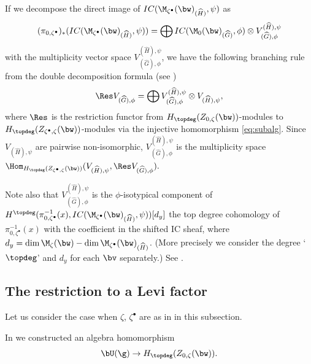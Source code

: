 If we decompose the direct image of
$IC(\M_{\zeta^\bullet}(\bw)_{(\widehat H)},\psi)$ as
\begin{equation}\label{eq:bullet}
   (\pi_{0,\zeta^\bullet})_*(IC(\M_{\zeta^\bullet}(\bw)_{(\widehat
     H)},\psi))
   = \bigoplus IC(\M_0(\bw)_{(\widehat G)},\phi)\otimes
     V_{(\widehat G),\phi}^{(\widehat H),\psi}
\end{equation}
with the multiplicity vector space $V_{(\widehat G),\phi}^{(\widehat
  H),\psi}$, we have the following branching rule from the double
decomposition formula (see \cite[1.11]{BM})
\begin{equation}\label{eq:branching}
   \Res V_{(\widehat G),\phi} = \bigoplus
   V_{(\widehat G),\phi}^{(\widehat H),\psi} \otimes V_{(\widehat H),\psi},
\end{equation}
where $\Res$ is the restriction functor from
$H_{\topdeg}(Z_{0,\zeta}(\bw))$-modules to
$H_{\topdeg}(Z_{\zeta^\bullet,\zeta}(\bw))$-modules via the injective
homomorphism \eqref{eq:subalg}. Since $V_{(\widehat H),\psi}$ are
pairwise non-isomorphic, $V_{(\widehat G),\phi}^{(\widehat H),\psi}$
is the multiplicity space
\(
   \Hom_{H_{\topdeg}(Z_{\zeta^\bullet,\zeta}(\bw))}
   (V_{(\widehat H),\psi}, \Res V_{(\widehat G),\phi}).
\)


Note also that $V_{(\widehat G),\phi}^{(\widehat H),\psi}$ is the
$\phi$-isotypical component of
\(
   H^{\topdeg}(\pi_{0,\zeta^\bullet}^{-1}(x),
   IC(\M_{\zeta^\bullet}(\bw)_{(\widehat H)},\psi))[d_y]
\)
the top degree cohomology of $\pi_{0,\zeta^\bullet}^{-1}(x)$ with the
coef\/f\/icient in the shifted IC sheaf, where
$d_y = \dim \M_\zeta(\bw) - \dim \M_{\zeta^\bullet}(\bw)_{(\widehat H)}$.
(More precisely we consider the degree `$\topdeg$' and $d_y$ for each
$\bv$ separately.) See \cite[1.10]{BM}.


\subsection{The restriction to a Levi factor}\label{subsec:rest_Levi}

Let us consider the case when $\zeta$, $\zeta^\bullet$ are as in
 in this subsection.

In \cite{Na-alg} we constructed an algebra homomorphism
\begin{equation*}
   \bU(\g) \to H_{\topdeg}(Z_{0,\zeta}(\bw)).
\end{equation*}

